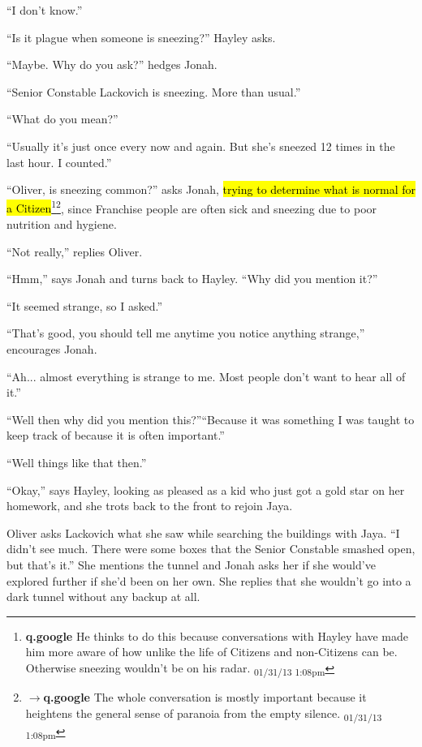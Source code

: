 ``I don't know.'' 

``Is it plague when someone is sneezing?'' Hayley asks.

``Maybe.  Why do you ask?'' hedges Jonah.

``Senior Constable Lackovich is sneezing.  More than usual.''

``What do you mean?''

``Usually it's just once every now and again.  But she's sneezed 12 times in the last hour.  I counted.''

``Oliver, is sneezing common?'' asks Jonah, \hl{trying to determine what is normal for a Citizen}\footnote{\textbf{q.google }He thinks to do this because conversations with Hayley have made him more aware of how unlike the life of Citizens and non-Citizens can be.  Otherwise sneezing wouldn't be on his radar. \textsubscript{01/31/13 1:08pm}}\footnote{$\rightarrow$\textbf{q.google }The whole conversation is mostly important because it heightens the general sense of paranoia from the empty silence. \textsubscript{01/31/13 1:08pm}}, since Franchise people are often sick and sneezing due to poor nutrition and hygiene.

``Not really,'' replies Oliver.

``Hmm,'' says Jonah and turns back to Hayley.  ``Why did you mention it?''

``It seemed strange, so I asked.''

``That's good, you should tell me anytime you notice anything strange,'' encourages Jonah.

``Ah... almost everything is strange to me.  Most people don't want to hear all of it.''

``Well then why did you mention this?''``Because it was something I was taught to keep track of because it is often important.''

``Well things like that then.''

``Okay,'' says Hayley, looking as pleased as a kid who just got a gold star on her homework, and she trots back to the front to rejoin Jaya.



Oliver asks Lackovich what she saw while searching the buildings with Jaya.  ``I didn't see much.  There were some boxes that the Senior Constable smashed open, but that's it.''  She mentions the tunnel and Jonah asks her if she would've explored further if she'd been on her own.  She replies that she wouldn't go into a dark tunnel without any backup at all.



